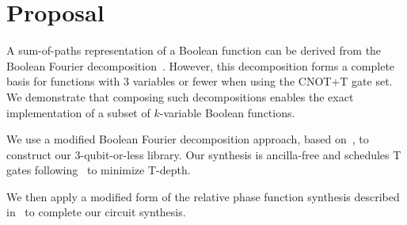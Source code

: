 \section{Proposal}

A sum-of-paths representation of a Boolean function can be derived from the Boolean Fourier decomposition~\cite{bib-odonnell}. However, this decomposition forms a complete basis for functions with 3 variables or fewer when using the CNOT+T gate set. We demonstrate that composing such decompositions enables the exact implementation of a subset of $k$-variable Boolean functions.

We use a modified Boolean Fourier decomposition approach, based on~\cite{bib-amy-phase-state}, to construct our 3-qubit-or-less library. Our synthesis is ancilla-free and schedules T gates following~\cite{amy2018} to minimize T-depth.

We then apply a modified form of the relative phase function synthesis described in~\cite{bib-amy-phase-state} to complete our circuit synthesis.

